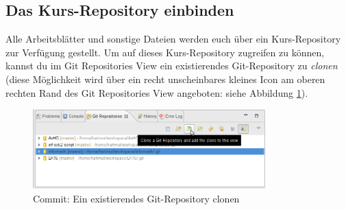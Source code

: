 % 

\subsection{Das Kurs-Repository einbinden}


Alle Arbeitsblätter und sonstige Dateien werden euch über ein Kurs-Repository
zur Verfügung gestellt. Um auf dieses Kurs-Repository zugreifen zu können,
kannst du im Git Repositories View ein existierendes Git-Repository zu
\emph{clonen} (diese Möglichkeit wird über ein recht unscheinbares kleines Icon
am oberen rechten Rand des Git Repositories View angeboten: siehe Abbildung
\ref{fig:git-clone}).

\begin{figure}[h]
  \centering
   \includegraphics[width=0.8\textwidth]{./inf/SEKII/01_Vorbereitung/Cloning_a_Git_Repository.png}
   \caption{Commit: Ein existierendes Git-Repository clonen}
   \label{fig:git-clone}
\end{figure}

